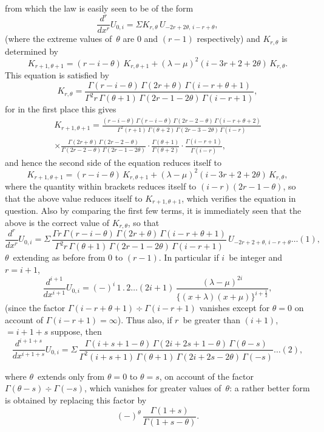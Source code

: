 \documentclass[11pt,a4paper]{book}
\begin{document}
\newpage
from which the law is easily seen to be of the form
\[
\frac{d^r}{dx^r} U_{0,i} = \Sigma K_{r,\theta} \, U_{-2r+2\theta,\,i-r+\theta},
\]
(where the extreme values of~$\theta$ are $0$ and $(r-1)$ respectively) and $K_{r,\theta}$ is determined by
\[
K_{r+1,\theta+1} = (r-i-\theta) \, K_{r,\theta+1} + (\lambda-\mu)^2 (i-3r+2+2\theta) \, K_{r,\theta}.
\]
This equation is satisfied by
\[
K_{r,\theta} = \frac{\Gamma(r-i-\theta)\,\Gamma(2r+\theta)\,\Gamma(i-r+\theta+1)}{\Gamma^2 r \, \Gamma(\theta+1) \, \Gamma(2r-1-2\theta) \, \Gamma(i-r+1)},
\]
for in the first place this gives
\begin{multline*}
K_{r+1,\theta+1} = \frac{(r-i-\theta)\,\Gamma(r-i-\theta)\,\Gamma(2r-2-\theta)\,\Gamma(i-r+\theta+2)}{\Gamma^2(r+1) \, \Gamma(\theta+2) \, \Gamma(2r-3-2\theta) \, \Gamma(i-r)} \\
\times \frac{\Gamma(2r+\theta)\,\Gamma(2r-2-\theta)}{\Gamma(2r-2-\theta)\,\Gamma(2r-1-2\theta)} \cdot \frac{\Gamma(\theta+1)}{\Gamma(\theta+2)} \cdot \frac{\Gamma(i-r+1)}{\Gamma(i-r)},
\end{multline*}
and hence the second side of the equation reduces itself to
\[
K_{r+1,\theta+1} = (r-i-\theta) \, K_{r,\theta+1} + (\lambda-\mu)^2 (i-3r+2+2\theta) \, K_{r,\theta},
\]
where the quantity within brackets reduces itself to $(i-r)(2r-1-\theta)$, so that the above value reduces itself to $K_{r+1,\theta+1}$, which verifies the equation in question. Also by comparing the first few terms, it is immediately seen that the above is the correct value of $K_{r,\theta}$, so that
\[
\frac{d^r}{dx^r} U_{0,i} = \Sigma \, \frac{\Gamma r \, \Gamma(r-i-\theta) \, \Gamma(2r+\theta) \, \Gamma(i-r+\theta+1)}{\Gamma^2 r \, \Gamma(\theta+1) \, \Gamma(2r-1-2\theta) \, \Gamma(i-r+1)} \, U_{-2r+2+\theta,\,i-r+\theta} \ldots(1),
\]
$\theta$~extending as before from $0$ to $(r-1)$. In particular if $i$~be integer and $r=i+1$,
\[
\frac{d^{i+1}}{dx^{i+1}} U_{0,i} = (-)^i \, 1 \, . \, 2 \ldots (2i+1) \, \frac{(\lambda-\mu)^{2i}}{\{(x+\lambda)(x+\mu)\}^{i+\frac{1}{2}}},
\]
(since the factor $\Gamma(i-r+\theta+1) \div \Gamma(i-r+1)$ vanishes except for $\theta=0$ on account of $\Gamma(i-r+1) = \infty$). Thus also, if $r$~be greater than $(i+1)$, $=i+1+s$ suppose, then
\[
\frac{d^{i+1+s}}{dx^{i+1+s}} U_{0,i} = \Sigma \, \frac{\Gamma(i+s+1-\theta)\,\Gamma(2i+2s+1-\theta)\,\Gamma(\theta-s)}{\Gamma^2(i+s+1)\,\Gamma(\theta+1)\,\Gamma(2i+2s-2\theta)\,\Gamma(-s)} \ldots(2),
\]

\newpage
where $\theta$~extends only from $\theta=0$ to $\theta=s$, on account of the factor $\Gamma(\theta-s) \div \Gamma(-s)$, which vanishes for greater values of~$\theta$: a rather better form is obtained by replacing this factor by
\[
(-)^\theta \, \frac{\Gamma(1+s)}{\Gamma(1+s-\theta)}.
\]
\end{document}
